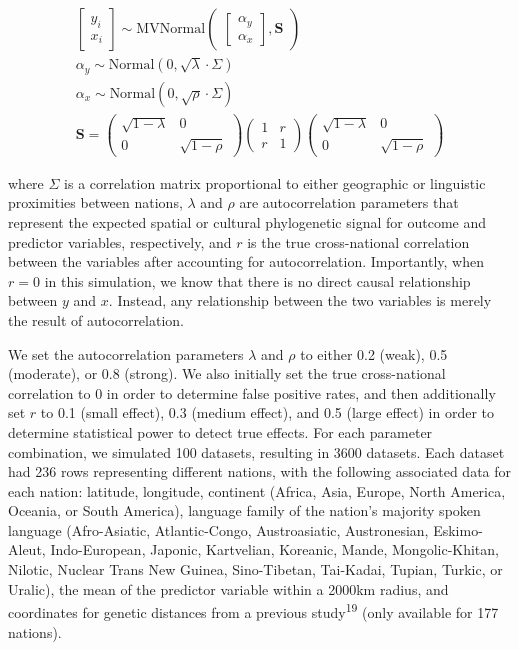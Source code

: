 \documentclass[
  man,floatsintext]{apa6}
\begin{document}
\begin{gather}
\begin{bmatrix}y_i\\x_i \end{bmatrix} \sim \text{MVNormal}
\begin{pmatrix}\begin{bmatrix}\alpha_y\\\alpha_x \end{bmatrix},\textbf{S}\end{pmatrix}\\
\alpha_y \sim \text{Normal}(0, \sqrt{\lambda} \cdot \Sigma) \nonumber \\
\alpha_x \sim \text{Normal}(0, \sqrt{\rho} \cdot \Sigma) \nonumber \\
\textbf{S} = 
\begin{pmatrix}\sqrt{1 - \lambda} & 0 \\ 0 & \sqrt{1 - \rho} \end{pmatrix}
\begin{pmatrix}1 & r \\ r & 1\end{pmatrix}
\begin{pmatrix}\sqrt{1 - \lambda} & 0 \\ 0 & \sqrt{1 - \rho} \end{pmatrix} \nonumber
\end{gather}

where \(\Sigma\) is a correlation matrix proportional to either geographic or linguistic proximities between nations, \(\lambda\) and \(\rho\) are autocorrelation parameters that represent the expected spatial or cultural phylogenetic signal for outcome and predictor variables, respectively, and \(r\) is the true cross-national correlation between the variables after accounting for autocorrelation. Importantly, when \(r = 0\) in this simulation, we know that there is no direct causal relationship between \(y\) and \(x\). Instead, any relationship between the two variables is merely the result of autocorrelation.

We set the autocorrelation parameters \(\lambda\) and \(\rho\) to either 0.2 (weak), 0.5 (moderate), or 0.8 (strong). We also initially set the true cross-national correlation to 0 in order to determine false positive rates, and then additionally set \(r\) to 0.1 (small effect), 0.3 (medium effect), and 0.5 (large effect) in order to determine statistical power to detect true effects. For each parameter combination, we simulated 100 datasets, resulting in 3600 datasets. Each dataset had 236 rows representing different nations, with the following associated data for each nation: latitude, longitude, continent (Africa, Asia, Europe, North America, Oceania, or South America), language family of the nation's majority spoken language (Afro-Asiatic, Atlantic-Congo, Austroasiatic, Austronesian, Eskimo-Aleut, Indo-European, Japonic, Kartvelian, Koreanic, Mande, Mongolic-Khitan, Nilotic, Nuclear Trans New Guinea, Sino-Tibetan, Tai-Kadai, Tupian, Turkic, or Uralic), the mean of the predictor variable within a 2000km radius, and coordinates for genetic distances from a previous study\textsuperscript{19} (only available for 177 nations).
\end{document}
